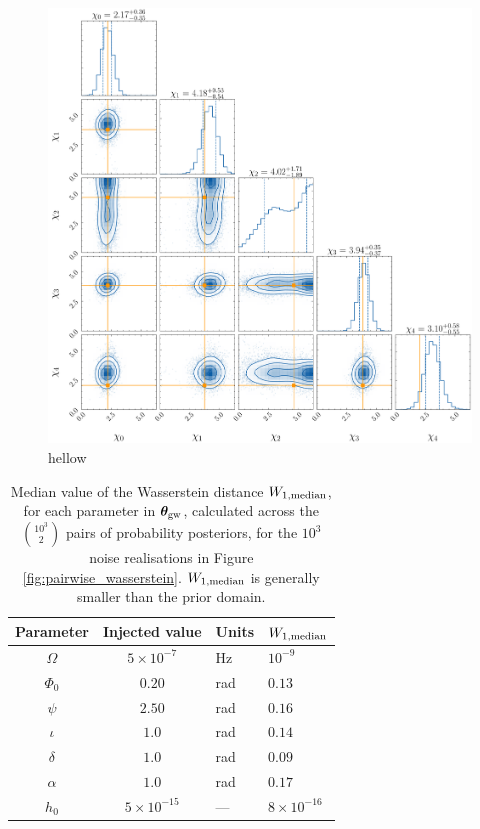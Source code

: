 \documentclass[fleqn,usenatbib,useAMS]{mnras}
\begin{document}
	\begin{figure}
	\includegraphics[width=\columnwidth, height =\columnwidth ]{images/corner_lowSNR_chi}
	\caption{hellow}
	\label{fig:corner_plot_3}
\end{figure}



\begin{table}
	\centering
	\begin{tabular}{ccll}
		\toprule
		Parameter & Injected value & Units & $W_{1, \rm median}$  \\
		\hline
		$\Omega$     &   $5 \times 10^{-7}$ & Hz & $10^{-9}$ \\
		$\Phi_0$          & $0.20$ & rad & $0.13$ \\
		$\psi$              & $2.50$ & rad & $0.16$ \\
		$\iota$             & $1.0$ & rad & $0.14$ \\ 
		$\delta$              & $1.0$  & rad & $0.09$ \\
		$\alpha$          & $1.0$  & rad & $0.17$\\
		$h_0$            & $5 \times 10^{-15}$ & --- & $8 \times 10^{-16}$ \\
		\bottomrule
	\end{tabular}
	\caption{Median value of the Wasserstein distance $W_{1, \rm median}$, for each parameter in $\boldsymbol{\theta}_{\rm gw}$, calculated across the $10^3 \choose 2$ pairs of probability posteriors, for the $10^3$ noise realisations in Figure \ref{fig:pairwise_wasserstein}. $W_{1, \rm median}$ is generally smaller than the prior domain.}
	\label{tab:Wasserstein}
\end{table}
\end{document}
